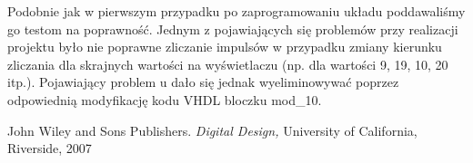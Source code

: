 \documentclass{classrep}
\begin{document}
Podobnie jak w pierwszym przypadku po zaprogramowaniu
układu poddawaliśmy go testom na poprawność. Jednym z pojawiających się problemów przy
realizacji projektu było nie poprawne zliczanie impulsów w przypadku zmiany kierunku zliczania dla
skrajnych wartości na wyświetlaczu (np. dla wartości 9, 19, 10, 20 itp.). Pojawiający problem u dało
się jednak wyeliminowywać poprzez odpowiednią modyfikację kodu VHDL bloczku mod\_10.




\begin{thebibliography}{0}
   John Wiley and Sons Publishers.
    \textsl{Digital Design,} University of California, Riverside, 2007
\end{thebibliography}
\end{document}
